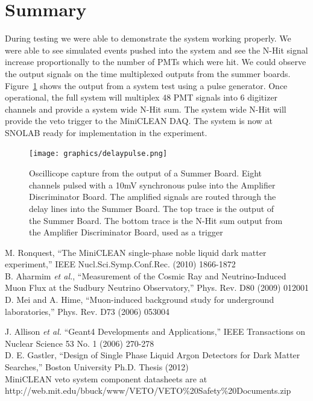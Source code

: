 \documentclass{JINST}
\begin{document}
\section{Summary}
\label{Summary}
%
During testing we were able to demonstrate the system working
properly.  We were able to see simulated events pushed into the system
and see the N-Hit signal increase proportionally to the number of PMTs
which were hit.  We could observe the output signals on the time
multiplexed outputs from the summer boards.  Figure~\ref{fig:multipulse}
shows the output from a system test using a pulse generator.
Once operational, the
full system will multiplex 48 PMT signals into 6 digitizer channels
and provide a system wide N-Hit sum.  The system wide N-Hit will
provide the veto trigger to the MiniCLEAN DAQ.  The system is now at
SNOLAB ready for implementation in the experiment.

\begin{figure}[ht]
	\begin{center}
		\texttt{[image: graphics/delaypulse.png]}
		\caption{Oscillicope capture from the output of a Summer Board.  Eight channels
			pulsed with a 10mV synchronous pulse into the Amplifier Discriminator Board.  The amplified
			signals are routed through the delay lines into the Summer Board.  The top trace is
			the output of the Summer Board.  The bottom trace is the N-Hit sum output from the
		Amplifier Discriminator Board, used as a trigger
	\label{fig:multipulse}}
	\end{center}
\end{figure}

\begin{thebibliography}{999}

M. Ronquest, ``The MiniCLEAN single-phase noble liquid dark matter experiment,'' IEEE Nucl.Sci.Symp.Conf.Rec. (2010) 1866-1872 \\

B. Aharmim {\it et al.}, ``Measurement of the Cosmic Ray and Neutrino-Induced Muon Flux at the Sudbury Neutrino Observatory,'' Phys. Rev. D80 (2009) 012001 \\

D. Mei and A. Hime, ``Muon-induced background study for underground laboratories,'' Phys. Rev. D73 (2006) 053004

J. Allison {\it et al.} ``Geant4 Developments and Applications,'' IEEE Transactions on Nuclear Science 53 No. 1 (2006) 270-278 \\

D. E. Gastler, ``Design of Single Phase Liquid Argon Detectors for Dark Matter Searches,'' Boston University Ph.D. Thesis (2012) \\

 MiniCLEAN veto system component datasheets are at http://web.mit.edu/bbuck/www/VETO/VETO\%20Safety\%20Documents.zip \\

\end{thebibliography}
\end{document}
